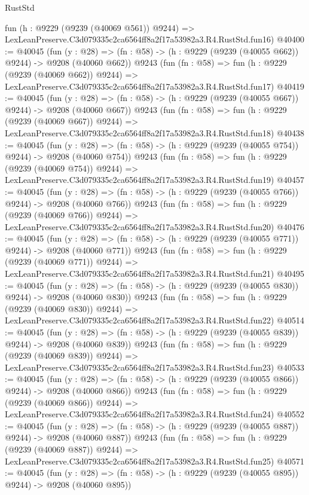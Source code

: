 \begin{lexlean}{RustStd}
\begin{coremodule}
    fun (h : @9229 (@9239 (@40069 @561)) @9244) =>
    LexLeanPreserve.C3d079335c2ca6564ff8a2f17a53982a3.R4.RustStd.fun16)
@40400 := @40045
    (fun (y : @28) => (fn : @58) -> (h : @9229 (@9239 (@40055 @662)) @9244) -> @9208 (@40060 @662))
    @9243
    (fun (fn : @58) =>
    fun (h : @9229 (@9239 (@40069 @662)) @9244) =>
    LexLeanPreserve.C3d079335c2ca6564ff8a2f17a53982a3.R4.RustStd.fun17)
@40419 := @40045
    (fun (y : @28) => (fn : @58) -> (h : @9229 (@9239 (@40055 @667)) @9244) -> @9208 (@40060 @667))
    @9243
    (fun (fn : @58) =>
    fun (h : @9229 (@9239 (@40069 @667)) @9244) =>
    LexLeanPreserve.C3d079335c2ca6564ff8a2f17a53982a3.R4.RustStd.fun18)
@40438 := @40045
    (fun (y : @28) => (fn : @58) -> (h : @9229 (@9239 (@40055 @754)) @9244) -> @9208 (@40060 @754))
    @9243
    (fun (fn : @58) =>
    fun (h : @9229 (@9239 (@40069 @754)) @9244) =>
    LexLeanPreserve.C3d079335c2ca6564ff8a2f17a53982a3.R4.RustStd.fun19)
@40457 := @40045
    (fun (y : @28) => (fn : @58) -> (h : @9229 (@9239 (@40055 @766)) @9244) -> @9208 (@40060 @766))
    @9243
    (fun (fn : @58) =>
    fun (h : @9229 (@9239 (@40069 @766)) @9244) =>
    LexLeanPreserve.C3d079335c2ca6564ff8a2f17a53982a3.R4.RustStd.fun20)
@40476 := @40045
    (fun (y : @28) => (fn : @58) -> (h : @9229 (@9239 (@40055 @771)) @9244) -> @9208 (@40060 @771))
    @9243
    (fun (fn : @58) =>
    fun (h : @9229 (@9239 (@40069 @771)) @9244) =>
    LexLeanPreserve.C3d079335c2ca6564ff8a2f17a53982a3.R4.RustStd.fun21)
@40495 := @40045
    (fun (y : @28) => (fn : @58) -> (h : @9229 (@9239 (@40055 @830)) @9244) -> @9208 (@40060 @830))
    @9243
    (fun (fn : @58) =>
    fun (h : @9229 (@9239 (@40069 @830)) @9244) =>
    LexLeanPreserve.C3d079335c2ca6564ff8a2f17a53982a3.R4.RustStd.fun22)
@40514 := @40045
    (fun (y : @28) => (fn : @58) -> (h : @9229 (@9239 (@40055 @839)) @9244) -> @9208 (@40060 @839))
    @9243
    (fun (fn : @58) =>
    fun (h : @9229 (@9239 (@40069 @839)) @9244) =>
    LexLeanPreserve.C3d079335c2ca6564ff8a2f17a53982a3.R4.RustStd.fun23)
@40533 := @40045
    (fun (y : @28) => (fn : @58) -> (h : @9229 (@9239 (@40055 @866)) @9244) -> @9208 (@40060 @866))
    @9243
    (fun (fn : @58) =>
    fun (h : @9229 (@9239 (@40069 @866)) @9244) =>
    LexLeanPreserve.C3d079335c2ca6564ff8a2f17a53982a3.R4.RustStd.fun24)
@40552 := @40045
    (fun (y : @28) => (fn : @58) -> (h : @9229 (@9239 (@40055 @887)) @9244) -> @9208 (@40060 @887))
    @9243
    (fun (fn : @58) =>
    fun (h : @9229 (@9239 (@40069 @887)) @9244) =>
    LexLeanPreserve.C3d079335c2ca6564ff8a2f17a53982a3.R4.RustStd.fun25)
@40571 := @40045
    (fun (y : @28) => (fn : @58) -> (h : @9229 (@9239 (@40055 @895)) @9244) -> @9208 (@40060 @895))

\end{coremodule}
\end{lexlean}
